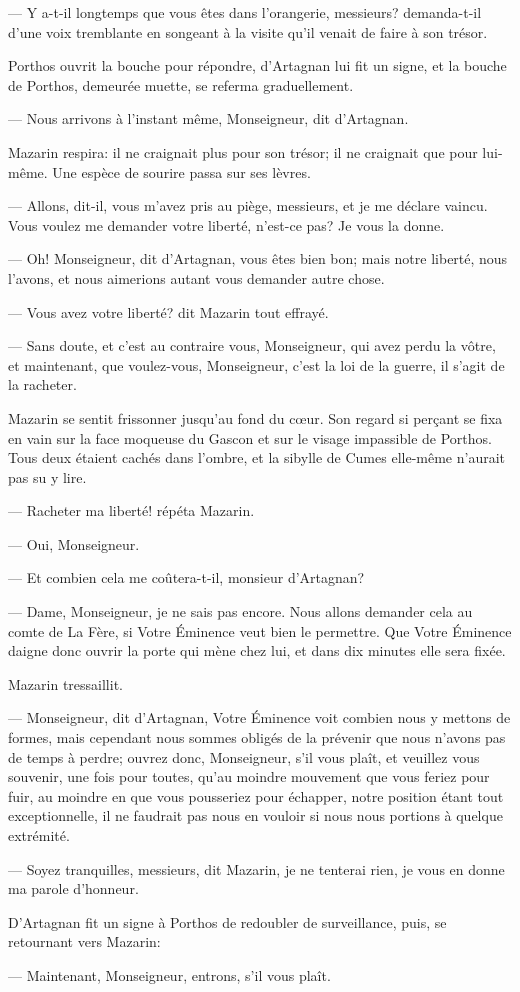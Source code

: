 — Y a-t-il longtemps que vous êtes dans l'orangerie, messieurs? demanda-t-il d'une voix tremblante en songeant à la visite qu'il venait de faire à son trésor.

Porthos ouvrit la bouche pour répondre, d'Artagnan lui fit un signe, et la bouche de Porthos, demeurée muette, se referma graduellement.

— Nous arrivons à l'instant même, Monseigneur, dit d'Artagnan.

Mazarin respira: il ne craignait plus pour son trésor; il ne craignait que pour lui-même. Une espèce de sourire passa sur ses lèvres.

— Allons, dit-il, vous m'avez pris au piège, messieurs, et je me déclare vaincu. Vous voulez me demander votre liberté, n'est-ce pas? Je vous la donne.

— Oh! Monseigneur, dit d'Artagnan, vous êtes bien bon; mais notre liberté, nous l'avons, et nous aimerions autant vous demander autre chose.

— Vous avez votre liberté? dit Mazarin tout effrayé.

— Sans doute, et c'est au contraire vous, Monseigneur, qui avez perdu la vôtre, et maintenant, que voulez-vous, Monseigneur, c'est la loi de la guerre, il s'agit de la racheter.

Mazarin se sentit frissonner jusqu'au fond du cœur. Son regard si perçant se fixa en vain sur la face moqueuse du Gascon et sur le visage impassible de Porthos. Tous deux étaient cachés dans l'ombre, et la sibylle de Cumes elle-même n'aurait pas su y lire.

— Racheter ma liberté! répéta Mazarin.

— Oui, Monseigneur.

— Et combien cela me coûtera-t-il, monsieur d'Artagnan?

— Dame, Monseigneur, je ne sais pas encore. Nous allons demander cela au comte de La Fère, si Votre Éminence veut bien le permettre. Que Votre Éminence daigne donc ouvrir la porte qui mène chez lui, et dans dix minutes elle sera fixée.

Mazarin tressaillit.

— Monseigneur, dit d'Artagnan, Votre Éminence voit combien nous y mettons de formes, mais cependant nous sommes obligés de la prévenir que nous n'avons pas de temps à perdre; ouvrez donc, Monseigneur, s'il vous plaît, et veuillez vous souvenir, une fois pour toutes, qu'au moindre mouvement que vous feriez pour fuir, au moindre en que vous pousseriez pour échapper, notre position étant tout exceptionnelle, il ne faudrait pas nous en vouloir si nous nous portions à quelque extrémité.

— Soyez tranquilles, messieurs, dit Mazarin, je ne tenterai rien, je vous en donne ma parole d'honneur.

D'Artagnan fit un signe à Porthos de redoubler de surveillance, puis, se retournant vers Mazarin:

— Maintenant, Monseigneur, entrons, s'il vous plaît.